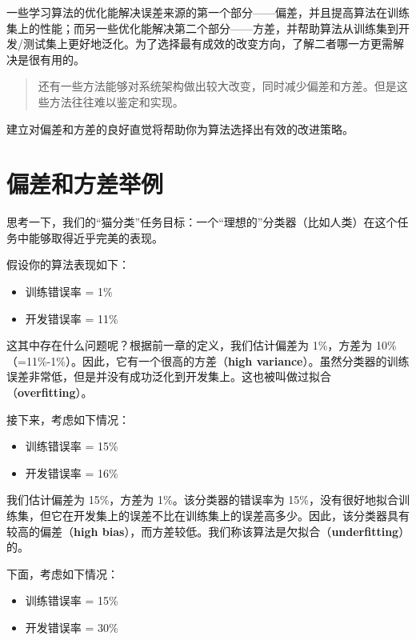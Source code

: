 一些学习算法的优化能解决误差来源的第一个部分------偏差，并且提高算法在训练集上的性能；而另一些优化能解决第二个部分------方差，并帮助算法从训练集到开发/测试集上更好地泛化。为了选择最有成效的改变方向，了解二者哪一方更需解决是很有用的。

\begin{quote}
还有一些方法能够对系统架构做出较大改变，同时减少偏差和方差。但是这些方法往往难以鉴定和实现。
\end{quote}

建立对偏差和方差的良好直觉将帮助你为算法选择出有效的改进策略。

\hypertarget{ux504fux5deeux548cux65b9ux5deeux4e3eux4f8b}{%
\chapter{偏差和方差举例}\label{ux504fux5deeux548cux65b9ux5deeux4e3eux4f8b}}

思考一下，我们的``猫分类''任务目标：一个``理想的''分类器（比如人类）在这个任务中能够取得近乎完美的表现。

假设你的算法表现如下：

\begin{itemize}
\tightlist
\item
  训练错误率 = 1\%
\item
  开发错误率 = 11\%
\end{itemize}

这其中存在什么问题呢？根据前一章的定义，我们估计偏差为 1\%，方差为
10\%（=11\%-1\%）。因此，它有一个很高的方差（\textbf{high
variance}）。虽然分类器的训练误差非常低，但是并没有成功泛化到开发集上。这也被叫做过拟合（\textbf{overfitting}）。

接下来，考虑如下情况：

\begin{itemize}
\tightlist
\item
  训练错误率 = 15\%
\item
  开发错误率 = 16\%
\end{itemize}

我们估计偏差为 15\%，方差为 1\%。该分类器的错误率为
15\%，没有很好地拟合训练集，但它在开发集上的误差不比在训练集上的误差高多少。因此，该分类器具有较高的偏差（\textbf{high
bias}），而方差较低。我们称该算法是欠拟合（\textbf{underfitting}）的。

下面，考虑如下情况：

\begin{itemize}
\tightlist
\item
  训练错误率 = 15\%
\item
  开发错误率 = 30\%
\end{itemize}

